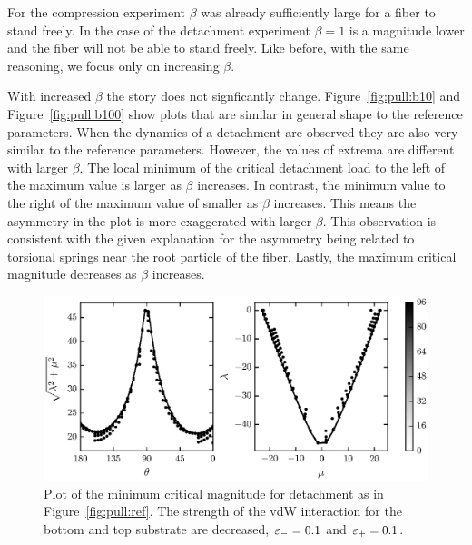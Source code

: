 For the compression experiment $\beta$ was already sufficiently large for a fiber to stand freely. In the case of the detachment experiment $\beta=1$ is a magnitude lower and the fiber will not be able to stand freely. Like before, with the same reasoning, we focus only on increasing $\beta$.

With increased $\beta$ the story does not signficantly change. Figure~\ref{fig:pull:b10} and Figure~\ref{fig:pull:b100} show plots that are similar in general shape to the reference parameters. When the dynamics of a detachment are observed they are also very similar to the reference parameters. However, the values of extrema are different with larger $\beta$. The local minimum of the critical detachment load to the left of the maximum value is larger as $\beta$ increases. In contrast, the minimum value to the right of the maximum value of smaller as $\beta$ increases. This means the asymmetry in the plot is more exaggerated with larger $\beta$. This observation is consistent with the given explanation for the asymmetry being related to torsional springs near the root particle of the fiber. Lastly, the maximum critical magnitude decreases as $\beta$ increases.

	\begin{figure}[t]
		\begin{center}
			\includegraphics{./fig/ch3/pull/eb0.1_et0.1/grid.eps}
		\end{center}		
		\caption{Plot of the minimum critical magnitude for detachment as in Figure~\ref{fig:pull:ref}. The strength of the vdW interaction for the bottom and top substrate are decreased, $\varepsilon_-=0.1$ and $\varepsilon_+=0.1$.
		\label{fig:pull:eb0.1_et0.1}}
	\end{figure}
	
